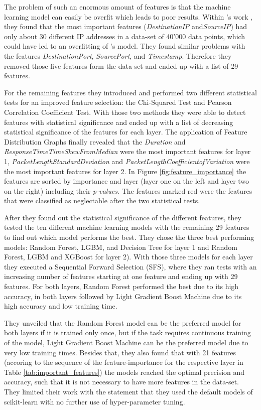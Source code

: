 The problem of such an enormous amount of features is that the machine learning model can easily be overfit which leads to poor results. Within \cite{Banadaki_DetectingMalicousDoHTrafficinDNSUsingML}’s work , they found that the most important features (\textit{DestinationIP}  and\textit{SourceIP}) had only about 30 different IP addresses in a data-set of 40’000 data points, which could have led to an overfitting of \cite{Banadaki_DetectingMalicousDoHTrafficinDNSUsingML}’s model. They found similar problems with the features \textit{DestinationPort}, \textit{SourcePort}, and \textit{Timestamp}. Therefore they removed those five features form the data-set and ended up with a list of 29 features. 

For the remaining features they introduced and performed two different statistical tests for an improved feature selection: the Chi-Squared Test and Pearson Correlation Coefficient Test. With those two methods they were able to detect features with statistical significance and ended up with a list of decreasing statistical significance of the features for each layer. The application of Feature Distribution Graphs finally revealed that the \textit{Duration} and \textit{ResponseTimeTimeSkewFromMedian} were the most important features for layer 1, \textit{PacketLengthStandardDeviation} and \textit{PacketLengthCoefficientofVariation} were the most important features for layer 2. In Figure \ref{fig:feature_importance} the features are sorted by importance and layer (layer one on the left and layer two on the right) including their \textit{p-values}. The features marked red were the features that were classified as neglectable after the two statistical tests.

After they found out the statistical significance of the different features, they tested the ten different machine learning models with the remaining 29 features to find out which model performs the best. They chose the three best performing models: Random Forest, LGBM, and Decision Tree for layer 1 and Random Forest, LGBM and XGBoost for layer 2). With those three models for each layer they executed a Sequential Forward Selection (SFS), where they ran tests with an increasing number of features starting at one feature and ending up with 29 features. For both layers, Random Forest performed the best due to its high accuracy, in both layers followed by Light Gradient Boost Machine due to its high accuracy and low training time. 

They unveiled that the Random Forest model can be the preferred model for both layers if it is trained only once, but if the task requires continuous training of the model, Light Gradient Boost Machine can be the preferred model due to very low training times. Besides that, they also found that with 21 features (accoring to the sequence of the feature-importance for the respective layer in Table \ref{tab:important_features}) the models reached the optimal precision and accuracy, such that it is not necessary to have more features in the data-set. They limited their work with the statement that they used the default models of scikit-learn with no further use of hyper-parameter tuning.

